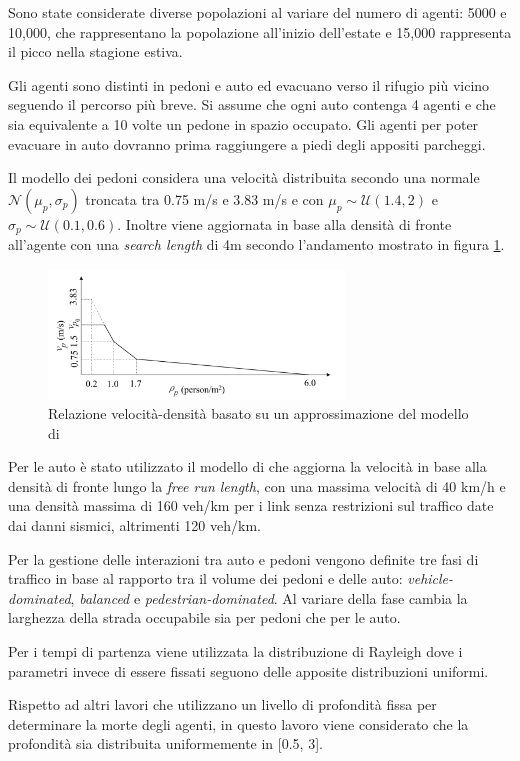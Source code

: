 Sono state considerate diverse popolazioni al variare del numero di agenti: 5000 e 10,000,
che rappresentano la popolazione all'inizio dell'estate e 15,000 rappresenta il picco nella stagione estiva.

Gli agenti sono distinti in pedoni e auto ed evacuano verso il rifugio più vicino seguendo il percorso più breve.
Si assume che ogni auto contenga 4 agenti e che sia equivalente a 10 volte un pedone in spazio occupato.
Gli agenti per poter evacuare in auto dovranno prima raggiungere a piedi degli appositi parcheggi.

Il modello dei pedoni considera una velocità distribuita secondo una normale $\mathcal{N}(\mu_p,\sigma_p)$ troncata tra 0.75 m/s e 3.83 m/s e
con $\mu_p \sim \mathcal{U}(1.4, 2)$ e $\sigma_p \sim \mathcal{U}(0.1, 0.6)$.
Inoltre viene aggiornata in base alla densità di fronte all'agente con una \textit{search length} di 4m secondo l'andamento mostrato in figura \ref*{fig:dadknakdand}.

\begin{figure}[ht]
    \centering
    \includegraphics[width=0.7\textwidth]{images/speed_WANG.png}
    \caption{Relazione velocità-densità \textcite{wang2021novel} basato su un approssimazione del modello di \textcite{goto2012tsunami}}
    \label{fig:dadknakdand}
\end{figure}

Per le auto è stato utilizzato il modello di \textcite{greenshields1935study} che aggiorna la velocità in base alla densità di fronte lungo la \textit{free run length},
con una massima velocità di 40 km/h e una densità massima di 160 veh/km per i link senza restrizioni sul traffico date dai danni sismici, altrimenti 120 veh/km.

Per la gestione delle interazioni tra auto e pedoni vengono definite tre fasi di traffico in base al rapporto
tra il volume dei pedoni e delle auto: \textit{vehicle-dominated}, \textit{balanced} e \textit{pedestrian-dominated}.
Al variare della fase cambia la larghezza della strada occupabile sia per pedoni che per le auto.

Per i tempi di partenza viene utilizzata la distribuzione di Rayleigh dove i parametri
invece di essere fissati seguono delle apposite distribuzioni uniformi.

Rispetto ad altri lavori che utilizzano un livello di profondità fissa per determinare la morte degli agenti, in questo lavoro
viene considerato che la profondità sia distribuita uniformemente in [0.5, 3]. 
